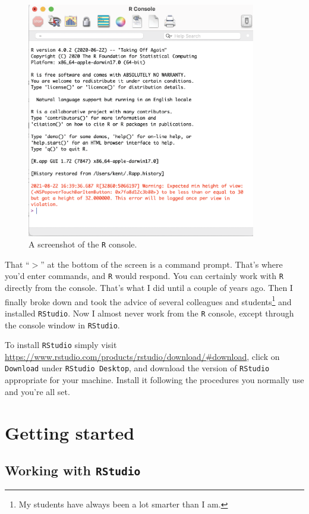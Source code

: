 \documentclass[12pt]{article}
\begin{document}
\begin{figure}
  \begin{center}
    \includegraphics[width=10cm]{R-screenshot.eps}
  \end{center}
  \caption{A screenshot of the {\tt R} console.}\label{fig:R-screenshot}
\end{figure}

\noindent That ``$>$'' at the bottom of the screen is a command
prompt. That's where you'd enter commands, and {\tt R} would
respond. You can certainly work with {\tt R} directly from the
console. That's what I did until a couple of years ago. Then I finally
broke down and took the advice of several colleagues and
students\footnote{My students have always been a lot smarter than I
  am.} and installed {\tt RStudio}. Now I almost never work from the
{\tt R} console, except through the console window in {\tt RStudio}.

To install {\tt RStudio} simply visit
\url{https://www.rstudio.com/products/rstudio/download/#download},
click on {\tt Download} under {\tt RStudio Desktop}, and download the
version of {\tt RStudio} appropriate for your machine. Install it
following the procedures you normally use and you're all set.

\section{Getting started}

\subsection{Working with {\tt RStudio}}
\end{document}
